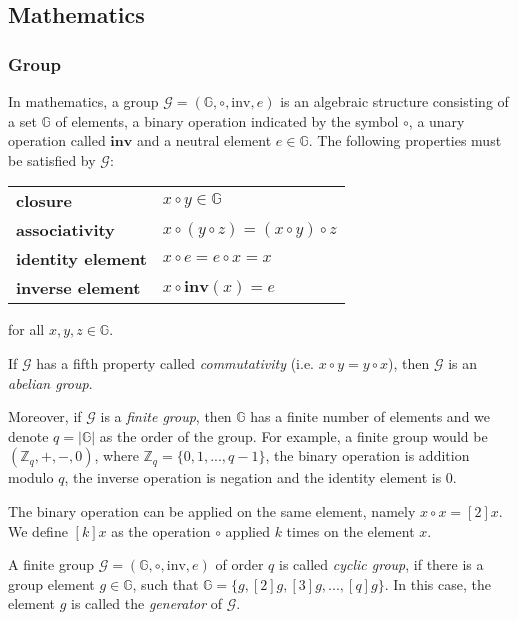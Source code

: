 \subsection{Mathematics} \label{app: mathematics}


\subsubsection{Group}
In mathematics, a group $\mathcal{G} = (\mathbb{G}, \circ, \mathrm{inv}, e)$ is an algebraic structure consisting of a set $\mathbb{G}$ of elements, a binary operation indicated by the symbol $\circ$, a unary operation called $\mathbf{inv}$ and a neutral element $e \in \mathbb{G}$. The following properties must be satisfied by $\mathcal{G}$:

\begin{center}
\begin{tabular}{ l l }
 \textbf{closure} & $x \circ y \in \mathbb{G}$ \\ 
 \textbf{associativity} & $x \circ (y \circ z) = (x \circ y) \circ z$ \\  
 \textbf{identity element} & $x \circ e = e \circ x = x$ \\
 \textbf{inverse element} & $x \circ \mathbf{inv}(x) = e$
\end{tabular}
\end{center}
for all $x, y, z \in \mathbb{G}$.

If $\mathcal{G}$ has a fifth property called \textit{commutativity} (i.e. $x \circ y = y \circ x$), then $\mathcal{G}$ is an \textit{abelian group}. 

Moreover, if $\mathcal{G}$ is a \textit{finite group}, then $\mathbb{G}$ has a finite number of elements and we denote $q = |\mathbb{G}|$ as the order of the group. For example, a finite group would be $(\mathbb{Z}_q, +, -, 0)$, where $\mathbb{Z}_q  = \{ 0, 1, ..., q-1 \}$, the binary operation is addition modulo $q$, the inverse operation is negation and the identity element is 0.

The binary operation can be applied on the same element, namely $x \circ x = [2]x$. We define $[k]x$ as the operation $\circ$ applied $k$ times on the element $x$. 

A finite group $\mathcal{G} = (\mathbb{G}, \circ, \mathrm{inv}, e)$ of order $q$ is called \textit{cyclic group}, if there is a group element $g \in \mathbb{G}$, such that $\mathbb{G} = \{ g, [2]g, [3]g, ..., [q]g \}$. In this case, the element $g$ is called the \textit{generator} of $\mathcal{G}$.


